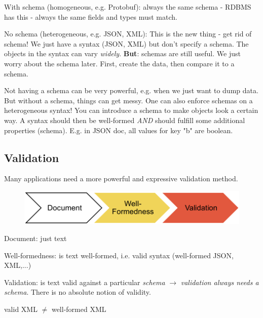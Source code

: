\documentclass[11pt,oneside,a4paper]{article}
\begin{document}
\begin{compactitem}
	\item With schema (homogeneous, e.g. Protobuf): always the same schema - RDBMS has this - always the same fields and types must match.
	\item No schema	(heterogeneous, e.g. JSON, XML): This is the new thing - get rid of schema! We just have a syntax (JSON, XML) but don't specify a schema. The objects in the syntax can vary \textit{widely}. \textbf{But}: schemas are still useful. We just worry about the schema later. First, create the data, then compare it to a schema.
\end{compactitem}

Not having a schema can be very powerful, e.g. when we just want to dump data. But without a schema, things can get messy. One can also enforce schemas on a heterogeneous syntax! You can introduce a schema to make objects look a certain way. A syntax should then be well-formed \textit{AND} should fulfill some additional properties (schema). E.g. in JSON doc, all values for key "b" are boolean.\\


\subsection{Validation}

Many applications need a more powerful and expressive validation method.

\begin{figure}[hb!]
	\centering
	\includegraphics[width=0.4\linewidth]{figures/validation_pipeline}
	\label{fig:validationpipeline}
\end{figure}

\begin{compactitem}
	\item Document: just text
	\item Well-formedness: is text well-formed, i.e. valid syntax (well-formed JSON, XML,...)
	\item Validation: is text valid against a particular \textit{schema} $\rightarrow$ \textit{validation always needs a schema}. There is no absolute notion of validity.
\end{compactitem}

\begin{center}
	valid XML $\neq$ well-formed XML
\end{center}
\vspace{-\topsep}
\end{document}
